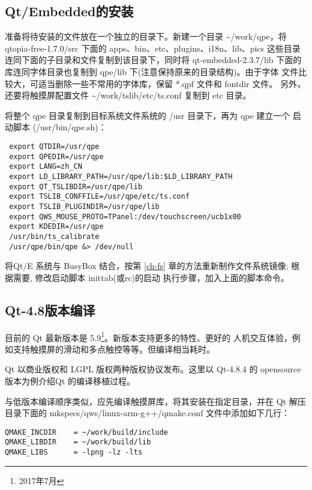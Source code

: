 \subsection{Qt/Embedded的安装}
准备将待安装的文件放在一个独立的目录下。新建一个目录
\textasciitilde/work/qpe，将
qtopia-free-1.7.0/src 下面的 apps、bin、etc、plugins、i18n、lib、pics
这些目录连同下面的子目录和文件复制到该目录下，同时将 qt-embedded-2.3.7/lib
下面的库连同字体目录也复制到 qpe/lib 下(注意保持原来的目录结构)。由于字体
文件比较大，可适当删除一些不常用的字体库，保留 *.qpf 文件和 fontdir 文件。
另外，还要将触摸屏配置文件 \textasciitilde/work/tslib/etc/ts.conf
复制到 etc 目录。

将整个 qpe 目录复制到目标系统文件系统的 /usr 目录下，再为 qpe 建立一个
启动脚本 (/usr/bin/qpe.sh)：
\begin{verbatim} 
 export QTDIR=/usr/qpe
 export QPEDIR=/usr/qpe
 export LANG=zh_CN
 export LD_LIBRARY_PATH=/usr/qpe/lib:$LD_LIBRARY_PATH
 export QT_TSLIBDIR=/usr/qpe/lib
 export TSLIB_CONFFILE=/usr/qpe/etc/ts.conf
 export TSLIB_PLUGINDIR=/usr/qpe/lib
 export QWS_MOUSE_PROTO=TPanel:/dev/touchscreen/ucb1x00
 export KDEDIR=/usr/qpe
 /usr/bin/ts_calibrate
 /usr/qpe/bin/qpe &> /dev/null
\end{verbatim}

将Qt/E 系统与 BusyBox 结合，按第 \ref{ch-fs}
章的方法重新制作文件系统镜像; 根据需要, 修改启动脚本 inittab(或rc)的启动
执行步骤，加入上面的脚本命令。

\subsection{Qt-4.8版本编译}
目前的 Qt 最新版本是 5.9\footnote{2017年7月}。新版本支持更多的特性、更好的
人机交互体验，例如支持触摸屏的滑动和多点触控等等。但编译相当耗时。

Qt 以商业版权和 LGPL 版权两种版权协议发布。这里以 Qt-4.8.4 的 opensource
版本为例介绍Qt 的编译移植过程。

与低版本编译顺序类似，应先编译触摸屏库，将其安装在指定目录，并在 Qt
解压目录下面的 mkspecs/qws/linux-arm-g++/qmake.conf 文件中添加如下几行：
\begin{verbatim}
QMAKE_INCDIR    = ~/work/build/include
QMAKE_LIBDIR    = ~/work/build/lib
QMAKE_LIBS      = -lpng -lz -lts
\end{verbatim}

